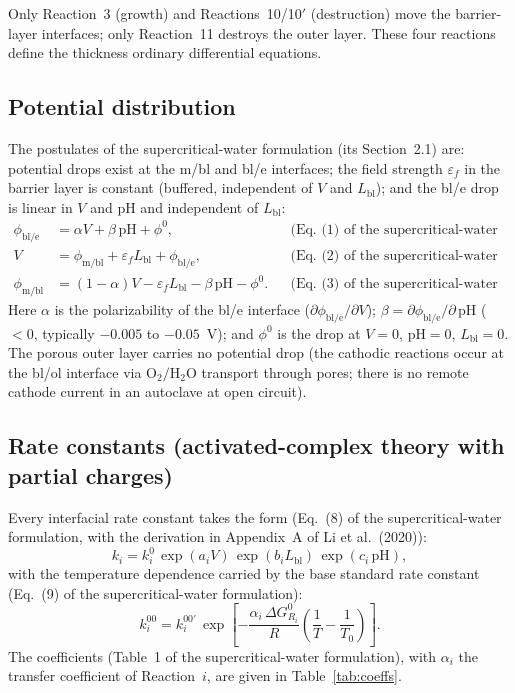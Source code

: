 Only Reaction~3 (growth) and Reactions~10/10$'$ (destruction) move the
barrier-layer interfaces; only Reaction~11 destroys the outer layer. These four
reactions define the thickness ordinary differential equations.

\subsection{Potential distribution}
\label{sec:potential}

The postulates of the supercritical-water formulation (its Section~2.1) are:
potential drops exist at the m/bl and bl/e interfaces; the field strength
$\varepsilon_f$ in the barrier layer is constant (buffered, independent of $V$
and $L_{\mathrm{bl}}$); and the bl/e drop is linear in $V$ and pH and
independent of $L_{\mathrm{bl}}$:
\begin{align}
\phi_{\mathrm{bl/e}} &= \alpha V + \beta\,\mathrm{pH} + \phi^0 ,
&&\text{(Eq.~(1) of the supercritical-water formulation)} \\
V &= \phi_{\mathrm{m/bl}} + \varepsilon_f L_{\mathrm{bl}} + \phi_{\mathrm{bl/e}} ,
&&\text{(Eq.~(2) of the supercritical-water formulation)} \\
\phi_{\mathrm{m/bl}} &= (1-\alpha) V - \varepsilon_f L_{\mathrm{bl}}
- \beta\,\mathrm{pH} - \phi^0 .
&&\text{(Eq.~(3) of the supercritical-water formulation)}
\end{align}
Here $\alpha$ is the polarizability of the bl/e interface
($\partial \phi_{\mathrm{bl/e}} / \partial V$);
$\beta = \partial \phi_{\mathrm{bl/e}} / \partial\,\mathrm{pH}$
($< 0$, typically $-0.005$ to $-0.05$~V); and $\phi^0$ is the drop at $V = 0$,
$\mathrm{pH} = 0$, $L_{\mathrm{bl}} = 0$. The porous outer layer carries no
potential drop (the cathodic reactions occur at the bl/ol interface via
$\mathrm{O_2}/\mathrm{H_2O}$ transport through pores; there is no remote
cathode current in an autoclave at open circuit).

\subsection{Rate constants (activated-complex theory with partial charges)}
\label{sec:rates}

Every interfacial rate constant takes the form
(Eq.~(8) of the supercritical-water formulation, with the derivation in
Appendix~A of Li et al.\ (2020)):
\begin{equation}
k_i = k_i^{0}\, \exp(a_i V)\, \exp(b_i L_{\mathrm{bl}})\, \exp(c_i\,\mathrm{pH}) ,
\label{eq:rateconstant}
\end{equation}
with the temperature dependence carried by the base standard rate constant
(Eq.~(9) of the supercritical-water formulation):
\begin{equation}
k_i^{00} = k_i^{00\prime}\,
\exp\!\left[ -\frac{\alpha_i\, \Delta G^0_{R_i}}{R}
\left( \frac{1}{T} - \frac{1}{T_0} \right) \right] .
\end{equation}
The coefficients (Table~1 of the supercritical-water formulation), with
$\alpha_i$ the transfer coefficient of Reaction~$i$, are given in
Table~\ref{tab:coeffs}.

